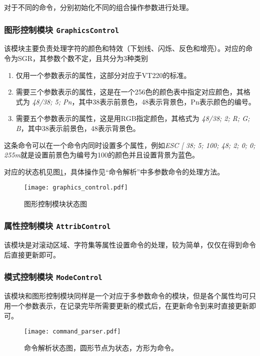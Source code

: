 对于不同的命令，分别初始化不同的组合操作参数进行处理。
\subsubsection{图形控制模块 \texttt{GraphicsControl}}
该模块主要负责处理字符的颜色和特效（下划线、闪烁、反色和增亮）。对应的命令为SGR，其参数个数不定，且共分为3种类别
\begin{enumerate}
	\item 仅用一个参数表示的属性，这部分对应于VT220的标准。
	\item 需要三个参数表示的属性，这是在一个256色的颜色表中指定对应颜色，其格式为 {\it 48/38; 5; Pn}，其中38表示前景色，48表示背景色，Pn表示颜色的编号。
	\item 需要五个参数表示的属性，这是用RGB指定颜色，其格式为 {\it 48/38; 2; R; G; B}，其中38表示前景色，48表示背景色。
\end{enumerate}

这条命令可以在一个命令内同时设置多个属性，例如{\it ESC [ 38; 5; 100; 48; 2; 0; 0; 255m}就是设置前景色为编号为100的颜色并且设置背景为蓝色。

	对应的状态机见图\ref{fig:graphics_control}，具体操作见``命令解析''中多参数命令的处理方法。
\begin{figure}[htbp]
\centerline{
\texttt{[image: graphics\_control.pdf]}
}
\caption{图形控制模块状态图}
\label{fig:graphics_control}
\end{figure}
\subsubsection{属性控制模块 \texttt{AttribControl}}
该模块是对滚动区域、字符集等属性设置命令的处理，较为简单，仅仅在得到命令后直接更新即可。
\subsubsection{模式控制模块 \texttt{ModeControl}}
该模块和图形控制模块同样是一个对应于多参数命令的模块，但是各个属性均可只用一个参数表示，在记录完毕所需要更新的模式后，在更新命令到来时直接更新即可。

\begin{landscape}
	\begin{figure}[htbp]
	\centerline{
	\texttt{[image: command\_parser.pdf]}
	}
	\caption{命令解析状态图，圆形节点为状态，方形为命令。}
	\label{fig:command_parser}
	\end{figure}
\end{landscape}
